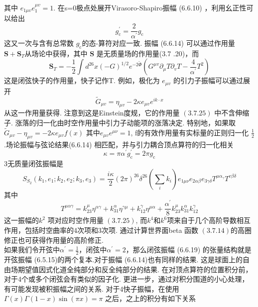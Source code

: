 其中 $e_{1 \mu v} e_{1}^{\mu v}=1$. 在s=0极点处展开Virasoro-Shapiro振幅 (6.6.10) ，利用幺正性可以给出
\begin{equation}
	g_{\mathrm{c}}^{\prime}=\frac{2}{\alpha^{\prime}} g_{\mathrm{c}}
\end{equation}
这又一次与含有总常数 $g_{\mathrm{c}} $的态-算符对应一致.  振幅 (6.6.14) 可以通过作用量 $\boldsymbol{S}+\boldsymbol{S}_{T}$从场论中获得，其中 $\boldsymbol{S}$ 是无质量场的作用量(3.7 .20)，而
\begin{equation}
	\boldsymbol{S}_{T}=-\frac{1}{2} \int d^{26} x(-G)^{1 / 2} e^{-2 \tilde{\Phi}}\left(G^{\mu v} \partial_{\mu} T \partial_{v} T-\frac{4}{\alpha^{\prime}} T^{2}\right)
\end{equation}
这是闭弦快子的作用量，快子记作T. 例如，极化为 $e_{\mu v}$ 的引力子振幅可以通过展开
\begin{equation}
	\tilde{G}_{\mu v}=\eta_{\mu v}-2 \kappa e_{\mu v} e^{i k \cdot x}
\end{equation}
从这一作用量获得. 注意到这是Einstein度规，它的作用量 $(3.7 .25)$ 中不含伸缩子. 涨落的归一化由时空作用量中引力子动能项的涨落决定. 特别地，如果取 $\widetilde{G}_{\mu v}-\eta_{\mu v}=-2 \kappa e_{\mu v} f(x)$ 其中$e_{\mu v} e^{\mu \nu}=1$, f的有效作用量有实标量的正则归一化 $\frac{1}{2}$ .场论振幅与弦论结果(6.6.14) 相匹配，并与引力耦合顶点算符的归一化相关
\begin{equation}
	\kappa=\pi \alpha^{\prime} g_{\mathrm{c}}^{\prime}=2 \pi g_{\mathrm{c}}
\end{equation}
3无质量闭弦振幅是
\begin{equation}
	S_{S_{2}}\left(k_{1}, e_{1} ; k_{2}, e_{2} ; k_{3}, e_{3}\right)=\frac{i \kappa}{2}(2 \pi)^{26} \delta^{26}\left(\sum_{i} k_{i}\right) e_{1 \mu \nu} e_{2 \alpha \beta} e_{3 \gamma \delta} T^{\mu \alpha_{\gamma}} T^{v \beta \delta}
\end{equation}
其中
\begin{equation}
	T^{\mu \alpha \gamma}=k_{23}^{\mu} \eta^{\alpha \gamma}+k_{31}^{\alpha} \eta^{\gamma \mu}+k_{12}^{\gamma} \eta^{\mu \alpha}+\frac{\alpha^{\prime}}{8} k_{23}^{\mu} k_{31}^{\alpha} k_{12}^{\gamma}
\end{equation}
这一振幅的$k^{2}$ 项对应时空作用量 $(3.7 .25)$, 而$k^{4}$和$k^{6}$项来自于几个高阶导数相互作用，包括时空曲率的4次项和3次项. 通过计算世界面beta 函数 $(3.7 .14)$的高圈修正也可获得作用量的高阶修正.\\
如果我们令开弦中$\alpha^{\prime}=\frac{1}{2}$，闭弦中$\alpha^{\prime}=2$，那么闭弦振幅 (6.6.19) 的张量结构就是开弦振幅 (6.5.15)的两个复本.对于振幅 (6.6.14)也有同样的结果. 这是球面上的自由场期望值因式化道全纯部分和反全纯部分的结果. 在对顶点算符的位置积分前，对于4个或多个闭弦会有类似的因子化. 更进一步，通过对积分围道的小心处理，有可能发现被积振幅之间的关系. 对于4快子振幅，在使用 $\Gamma(x) \Gamma(1-x) \sin (\pi x)=\pi $  之后，之上的积分有如下关系
